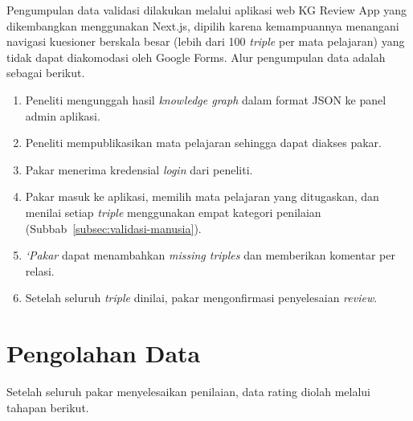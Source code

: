 \documentclass[main]{subfiles}
\begin{document}
Pengumpulan data validasi dilakukan melalui aplikasi web KG Review App
yang dikembangkan menggunakan Next.js, dipilih karena kemampuannya
menangani navigasi kuesioner berskala besar (lebih dari 100
\textit{triple} per mata pelajaran) yang tidak dapat diakomodasi oleh
Google Forms. Alur pengumpulan data adalah sebagai berikut.

\begin{enumerate}
  \item Peneliti mengunggah hasil \textit{knowledge graph} dalam format
        JSON ke panel admin aplikasi.
  \item Peneliti mempublikasikan mata pelajaran sehingga dapat diakses
        pakar.
  \item Pakar menerima kredensial \textit{login} dari
        peneliti.
  \item Pakar masuk ke aplikasi, memilih mata pelajaran yang
        ditugaskan, dan menilai setiap \textit{triple} menggunakan empat
        kategori penilaian (Subbab~\ref{subsec:validasi-manusia}).
  \item \textit{`Pakar} dapat menambahkan \textit{missing triples} dan
        memberikan komentar per relasi.
  \item Setelah seluruh \textit{triple} dinilai, pakar
        mengonfirmasi penyelesaian \textit{review}.
\end{enumerate}

\section{Pengolahan Data}\label{sec:pengolahan-data}

Setelah seluruh pakar menyelesaikan penilaian, data rating
diolah melalui tahapan berikut.
\end{document}
